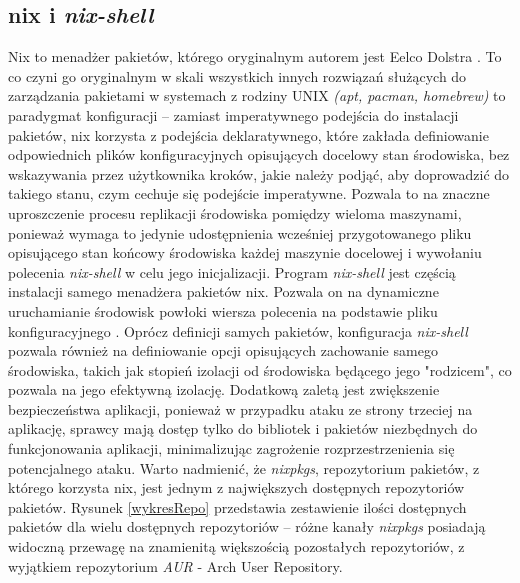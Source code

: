 \subsection{nix i \textit{nix-shell}}
Nix to menadżer pakietów, którego oryginalnym autorem jest Eelco Dolstra \cite{nix-repo}. To co czyni go oryginalnym w skali wszystkich innych rozwiązań służących do zarządzania pakietami w systemach z rodziny UNIX \textit{(apt, pacman, homebrew)} to paradygmat konfiguracji -- zamiast imperatywnego podejścia do instalacji pakietów, nix korzysta z podejścia deklaratywnego, które zakłada definiowanie odpowiednich plików konfiguracyjnych opisujących docelowy stan środowiska, bez wskazywania przez użytkownika kroków, jakie należy podjąć, aby doprowadzić do takiego stanu, czym cechuje się podejście imperatywne. Pozwala to na znaczne uproszczenie procesu replikacji środowiska pomiędzy wieloma maszynami, ponieważ wymaga to jedynie udostępnienia wcześniej przygotowanego pliku opisującego stan końcowy środowiska każdej maszynie docelowej i wywołaniu polecenia \textit{nix-shell} w celu jego inicjalizacji. 
\newline \noindent Program \textit{nix-shell} jest częścią instalacji samego menadżera pakietów nix. Pozwala on na dynamiczne uruchamianie środowisk powłoki wiersza polecenia na podstawie pliku konfiguracyjnego \cite{nix-shell}. Oprócz definicji samych pakietów, konfiguracja \textit{nix-shell} pozwala również na definiowanie opcji opisujących zachowanie samego środowiska, takich jak stopień izolacji od środowiska będącego jego "rodzicem", co pozwala na jego efektywną izolację. Dodatkową zaletą jest zwiększenie bezpieczeństwa aplikacji, ponieważ w przypadku ataku ze strony trzeciej na aplikację, sprawcy mają dostęp tylko do bibliotek i pakietów niezbędnych do funkcjonowania aplikacji, minimalizując zagrożenie rozprzestrzenienia się potencjalnego ataku.
\newline \noindent Warto nadmienić, że \textit{nixpkgs}, repozytorium pakietów, z którego korzysta nix, jest jednym z największych dostępnych repozytoriów pakietów. Rysunek \ref{wykresRepo} przedstawia zestawienie ilości dostępnych pakietów dla wielu dostępnych repozytoriów -- różne kanały \textit{nixpkgs} posiadają widoczną przewagę na znamienitą większością pozostałych repozytoriów, z wyjątkiem repozytorium \textit{AUR} - Arch User Repository.

